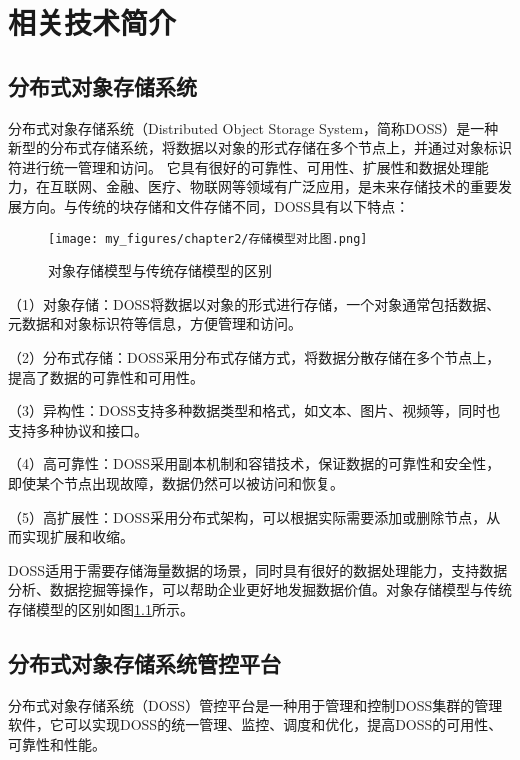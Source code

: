 \chapter{相关技术简介}

\section{分布式对象存储系统}

分布式对象存储系统（Distributed Object Storage System，简称DOSS）是一种新型的分布式存储系统，将数据以对象的形式存储在多个节点上，并通过对象标识符进行统一管理和访问。
它具有很好的可靠性、可用性、扩展性和数据处理能力，在互联网、金融、医疗、物联网等领域有广泛应用，是未来存储技术的重要发展方向。与传统的块存储和文件存储不同，DOSS具有以下特点：

\begin{figure}[h]
    \centering
    \texttt{[image: my\_figures/chapter2/存储模型对比图.png]}
    \caption{对象存储模型与传统存储模型的区别}
    \label{fig:/存储模型对比图}
\end{figure}

（1）对象存储：DOSS将数据以对象的形式进行存储，一个对象通常包括数据、元数据和对象标识符等信息，方便管理和访问。

（2）分布式存储：DOSS采用分布式存储方式，将数据分散存储在多个节点上，提高了数据的可靠性和可用性。

（3）异构性：DOSS支持多种数据类型和格式，如文本、图片、视频等，同时也支持多种协议和接口。

（4）高可靠性：DOSS采用副本机制和容错技术，保证数据的可靠性和安全性，即使某个节点出现故障，数据仍然可以被访问和恢复。

（5）高扩展性：DOSS采用分布式架构，可以根据实际需要添加或删除节点，从而实现扩展和收缩。

DOSS适用于需要存储海量数据的场景，同时具有很好的数据处理能力，支持数据分析、数据挖掘等操作，可以帮助企业更好地发掘数据价值。对象存储模型与传统存储模型的区别如图\ref{fig:/存储模型对比图}所示。




\section{分布式对象存储系统管控平台}

分布式对象存储系统（DOSS）管控平台是一种用于管理和控制DOSS集群的管理软件，它可以实现DOSS的统一管理、监控、调度和优化，提高DOSS的可用性、可靠性和性能。

